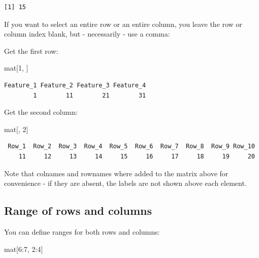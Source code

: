 \documentclass[
]{book}
\newenvironment{Shaded}{\begin{snugshade}}{\end{snugshade}}
\newcommand{\DecValTok}[1]{\textcolor[rgb]{0.00,0.00,0.81}{#1}}
\newcommand{\NormalTok}[1]{#1}
\newcommand{\SpecialCharTok}[1]{\textcolor[rgb]{0.00,0.00,0.00}{#1}}
\begin{document}
\begin{verbatim}
[1] 15
\end{verbatim}

If you want to select an entire row or an entire column, you leave the row or column index blank, but - necessarily - use a comma:

Get the first row:

\begin{Shaded}
\begin{Highlighting}[]
\NormalTok{mat[}\DecValTok{1}\NormalTok{, ]}
\end{Highlighting}
\end{Shaded}

\begin{verbatim}
Feature_1 Feature_2 Feature_3 Feature_4 
        1        11        21        31 
\end{verbatim}

Get the second column:

\begin{Shaded}
\begin{Highlighting}[]
\NormalTok{mat[, }\DecValTok{2}\NormalTok{]}
\end{Highlighting}
\end{Shaded}

\begin{verbatim}
 Row_1  Row_2  Row_3  Row_4  Row_5  Row_6  Row_7  Row_8  Row_9 Row_10 
    11     12     13     14     15     16     17     18     19     20 
\end{verbatim}

Note that colnames and rownames where added to the matrix above for convenience - if they are absent, the labels are not shown above each element.

\hypertarget{range-of-rows-and-columns}{%
\subsection{Range of rows and columns}\label{range-of-rows-and-columns}}

You can define ranges for both rows and columns:

\begin{Shaded}
\begin{Highlighting}[]
\NormalTok{mat[}\DecValTok{6}\SpecialCharTok{:}\DecValTok{7}\NormalTok{, }\DecValTok{2}\SpecialCharTok{:}\DecValTok{4}\NormalTok{]}
\end{Highlighting}
\end{Shaded}
\end{document}
